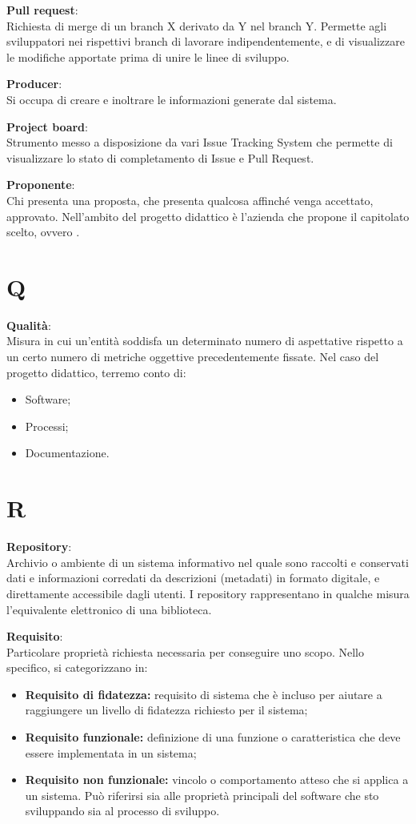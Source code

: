 \documentclass[a4paper, oneside, openany, dvipsnames, table]{article}
\begin{document}
\textbf{Pull request}:\\	Richiesta di merge di un branch X derivato da Y nel branch Y. Permette agli sviluppatori nei rispettivi branch di lavorare indipendentemente, e di visualizzare le modifiche apportate prima di unire le linee di sviluppo.

\textbf{Producer}:\\	Si occupa di creare e inoltrare le informazioni generate dal sistema.

\textbf{Project board}:\\	Strumento messo a disposizione da vari Issue Tracking System che permette di visualizzare lo stato di completamento di Issue e Pull Request.


\textbf{Proponente}:\\	Chi presenta una proposta, che presenta qualcosa affinché venga accettato, approvato. Nell'ambito del progetto didattico è l'azienda che propone il capitolato scelto, ovvero \proponente .


\newpage
\section{Q}
\textbf{Qualità}:\\	Misura in cui un'entità soddisfa un determinato numero di aspettative rispetto a un certo numero di metriche oggettive precedentemente fissate. Nel caso del progetto didattico, terremo conto di:
\begin{itemize}
	\item Software;
	\item Processi;
	\item Documentazione.
\end{itemize}


\newpage
\section{R}
\textbf{Repository}:\\	Archivio o ambiente di un sistema informativo nel quale sono raccolti e conservati dati e informazioni corredati da descrizioni (metadati) in formato digitale, e direttamente accessibile dagli utenti. I repository rappresentano in qualche misura l’equivalente elettronico di una biblioteca.

\textbf{Requisito}:\\	Particolare proprietà richiesta necessaria per conseguire uno scopo. Nello specifico, si categorizzano in:
\begin{itemize}
	\item \textbf{Requisito di fidatezza:} requisito di sistema che è incluso per aiutare a raggiungere un livello di fidatezza richiesto per il sistema;
	\item \textbf{Requisito funzionale:} definizione di una funzione o caratteristica che deve essere implementata in un sistema;
	\item \textbf{Requisito non funzionale:} vincolo o comportamento atteso che si applica a un sistema. Può riferirsi sia alle proprietà principali del software che sto sviluppando sia al processo di sviluppo.
\end{itemize}
\end{document}
